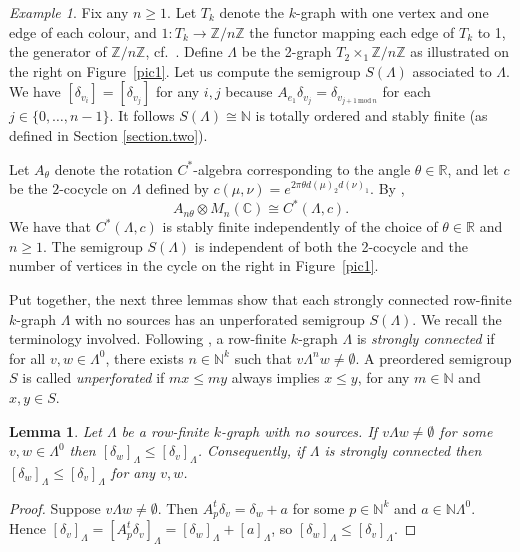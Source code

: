 \documentclass[a4paper, 12pt]{amsart}
\numberwithin{equation}{section}
\newcounter{theorem}
\newtheorem{lemma}[theorem]{Lemma}
\theoremstyle{remark}
\newtheorem{example}[theorem]{Example}
\theoremstyle{definition}
\begin{document}
\begin{example}\label{eq.rotation.algebra}
Fix any $n\geq 1$. Let $T_k$ denote the $k$-graph with one vertex and one edge of each
colour, and $1\colon T_k\to {\mathbb{Z}} / n{\mathbb{Z}}$ the functor mapping each edge of $T_k$ to 1, the
generator of $ {\mathbb{Z}} / n{\mathbb{Z}}$, cf.~\cite[Definition 5.2]{MR3311883}. Define $\Lambda$ be
the 2-graph $T_2 \times_1  {\mathbb{Z}} / n{\mathbb{Z}}$ as illustrated on the right on Figure~\ref{pic1}.
Let us compute the semigroup $S(\Lambda)$ associated to $\Lambda$. We have
$[\delta_{v_i}]=[\delta_{v_j}]$ for any $i,j$ because $A_{e_1}\delta_{v_j}=\delta_{v_{j+1 \,
\text{mod}\,  n}}$ for each $j\in \{0,\dots,n-1\}$. It follows $S(\Lambda) \cong {\mathbb{N}}$ is
totally ordered and stably finite (as defined in Section \ref{section.two}).

Let $A_\theta$ denote the rotation $C^*$-algebra corresponding to the angle $\theta\in
{\mathbb{R}}$, and let $c$ be the $2$-cocycle on $\Lambda$ defined by $c(\mu,\nu)=e^{2\pi \theta
d(\mu)_2 d(\nu)_1}$. By \cite[Lemma~5.8]{MR3311883}, $$A_{n\theta}\otimes M_{n}({\mathbb{C}})\cong
C^*(\Lambda,c).$$ We have that $C^*(\Lambda,c)$ is stably finite independently of the
choice of $\theta\in {\mathbb{R}}$ and $n\geq 1$. The semigroup $S(\Lambda)$ is independent of
both the 2-cocycle and the number of vertices in the cycle on the right in
Figure~\ref{pic1}.
\end{example}

Put together, the next three lemmas show that each strongly connected row-finite $k$-graph $\Lambda$
with no sources has an unperforated semigroup $S(\Lambda)$. We recall the terminology
involved. Following \cite{MR3444442}, a row-finite $k$-graph $\Lambda$ is \emph{strongly
connected} if for all $v,w\in \Lambda^0$, there exists $n\in {\mathbb{N}}^k$ such that
$v\Lambda^nw\neq \emptyset$. A preordered semigroup $S$ is called \emph{unperforated} if
$mx\leq my$ always implies $x\leq y$, for any $m \in {\mathbb{N}}$ and $x, y\in S$.

\begin{lemma}\label{lem.connected}
Let $\Lambda$ be a row-finite $k$-graph with no sources. If $v\Lambda w\neq \emptyset$
for some $v,w\in \Lambda^0$ then ${{[{\delta_w}]_\Lambda}}\leq {{[{\delta_v}]_\Lambda}}$. Consequently,
if $\Lambda$ is strongly connected then ${{[{\delta_w}]_\Lambda}}\leq {{[{\delta_v}]_\Lambda}}$ for any
$v,w$.
\end{lemma}

\begin{proof} Suppose  $v\Lambda w\neq \emptyset$. Then $A^t_p\delta_v=\delta_w + a$ for some $p\in {\mathbb{N}}^k$ and $a\in {\mathbb{N}}\Lambda^0$. Hence ${{[{\delta_v}]_\Lambda}}={{[{A^t_p\delta_v}]_\Lambda}}={{[{\delta_w}]_\Lambda}}+{{[{a}]_\Lambda}}$, so ${{[{\delta_w}]_\Lambda}}\leq {{[{\delta_v}]_\Lambda}}$.
\end{proof}
\end{document}
